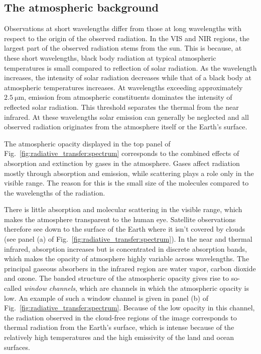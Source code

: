 \subsection{The atmospheric background}

Observations at short wavelengths differ from those at long wavelengths with
respect to the origin of the observed radiation. In the VIS and NIR regions, the
largest part of the observed radiation stems from the sun. This is because, at
these short wavelengths, black body radiation at typical atmospheric
temperatures is small compared to reflection of solar radiation. As the
wavelength increases, the intensity of solar radiation decreases while that of a
black body at atmospheric temperatures increases. At wavelengths exceeding
approximately $\SI{2.5}{\micro \meter}$, emission from atmospheric constituents
dominates the intensity of reflected solar radiation. This threshold separates
the thermal from the near infrared. At these wavelengths solar emission can
generally be neglected and all observed radiation originates from the atmosphere
itself or the Earth's surface.

The atmospheric opacity displayed in the top panel of
Fig.~\ref{fig:radiative_transfer:spectrum} corresponds to the combined effects
of absorption and extinction by gases in the atmosphere. Gases affect radiation
mostly through absorption and emission, while scattering plays a role only in
the visible range. The reason for this is the small size of the molecules
compared to the wavelengths of the radiation.

There is little absorption and molecular scattering in the visible range, which
makes the atmosphere transparent to the human eye. Satellite observations
therefore see down to the surface of the Earth where it isn't covered by clouds
(see panel (a) of Fig.~\ref{fig:radiative_transfer:spectrum}). In the near and
thermal infrared, absorption increases but is concentrated in discrete
absorption bands, which makes the opacity of atmosphere highly variable across
wavelengths. The principal gaseous absorbers in the infrared region are water
vapor, carbon dioxide and ozone. The banded structure of the atmospheric opacity
gives rise to so-called \textit{window channels}, which are channels in which
the atmospheric opacity is low. An example of such a window channel is given in
panel (b) of Fig.~\ref{fig:radiative_transfer:spectrum}. Because of the low
opacity in this channel, the radiation observed in the cloud-free regions of the
image corresponds to thermal radiation from the Earth's surface, which is
intense because of the relatively high temperatures and the high emissivity of
the land and ocean surfaces.

